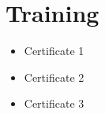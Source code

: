 \documentclass[a4paper,11pt]{article}
\begin{document}

\section{Training}
\begin{itemize}[nosep,after=\strut, leftmargin=1em, itemsep=3pt]
\item Certificate 1\item Certificate 2\item Certificate 3
\end{itemize}

\vfill
\end{document}
